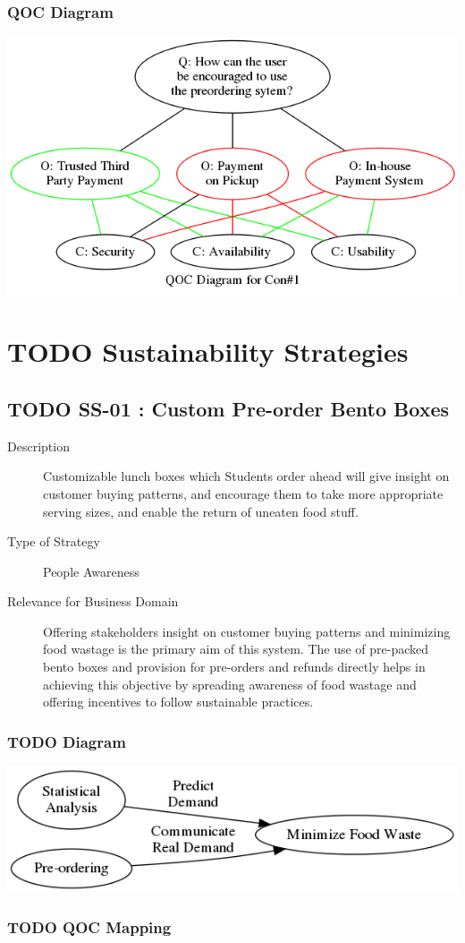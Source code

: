 \documentclass[11pt]{article}
\begin{document}
\subsubsection*{QOC Diagram}
\label{sec:orgbd5908d}
\begin{center}
\includegraphics[width=.9\linewidth]{res/qoc_01.png}
\end{center}

\section{{\bfseries\sffamily TODO} Sustainability Strategies}
\label{sec:org97c86ee}
\subsection{{\bfseries\sffamily TODO} \label{org5e107f3}SS-01 : Custom Pre-order Bento Boxes}
\label{sec:orgf1c75d9}
\begin{description}
\item[{Description}] Customizable lunch boxes which Students order
ahead will give insight on customer buying
patterns, and encourage them to take more
appropriate serving sizes, and enable the return
of uneaten food stuff.
\item[{Type of Strategy}] People Awareness
\item[{Relevance for Business Domain}] Offering stakeholders insight on
customer buying patterns and minimizing food wastage is the
primary aim of this system. The use of pre-packed bento boxes
and provision for pre-orders and refunds directly helps in
achieving this objective by spreading awareness of food
wastage and offering incentives to follow sustainable
practices.
\end{description}
\subsubsection{{\bfseries\sffamily TODO} Diagram}
\label{sec:orgc70323b}
\begin{center}
\includegraphics[width=.9\linewidth]{res/ss_01.png}
\end{center}

\subsubsection{{\bfseries\sffamily TODO} QOC Mapping}
\label{sec:org04f27a1}
\end{document}
